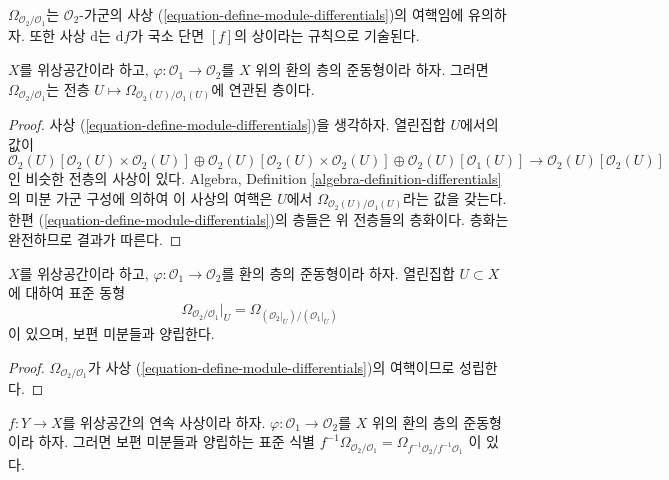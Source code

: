 \noindent
$\Omega_{\mathcal{O}_2/\mathcal{O}_1}$는
$\mathcal{O}_2$-가군의 사상
(\ref{equation-define-module-differentials})의 여핵임에 유의하자.
또한 사상 $\text{d}$는 $\text{d}f$가 국소 단면 $[f]$의 상이라는
규칙으로 기술된다.

\begin{lemma}
\label{lemma-differentials-sheafify}
$X$를 위상공간이라 하고,
$\varphi : \mathcal{O}_1 \to \mathcal{O}_2$를 $X$ 위의 환의 층의
준동형이라 하자. 그러면 $\Omega_{\mathcal{O}_2/\mathcal{O}_1}$는
전층 $U \mapsto \Omega_{\mathcal{O}_2(U)/\mathcal{O}_1(U)}$에
연관된 층이다.
\end{lemma}

\begin{proof}
사상 (\ref{equation-define-module-differentials})을 생각하자.
열린집합 $U$에서의 값이
$$
\mathcal{O}_2(U)[\mathcal{O}_2(U) \times \mathcal{O}_2(U)] \oplus
\mathcal{O}_2(U)[\mathcal{O}_2(U) \times \mathcal{O}_2(U)] \oplus
\mathcal{O}_2(U)[\mathcal{O}_1(U)]
\longrightarrow
\mathcal{O}_2(U)[\mathcal{O}_2(U)]
$$
인 비슷한 전층의 사상이 있다. Algebra, Definition
\ref{algebra-definition-differentials}의 미분 가군 구성에 의하여
이 사상의 여핵은 $U$에서
$\Omega_{\mathcal{O}_2(U)/\mathcal{O}_1(U)}$라는 값을 갖는다.
한편 (\ref{equation-define-module-differentials})의 층들은 위 전층들의
층화이다. 층화는 완전하므로 결과가 따른다.
\end{proof}

\begin{lemma}
\label{lemma-localize-differentials}
$X$를 위상공간이라 하고,
$\varphi : \mathcal{O}_1 \to \mathcal{O}_2$를 환의 층의 준동형이라 하자.
열린집합 $U \subset X$에 대하여 표준 동형
$$
\Omega_{\mathcal{O}_2/\mathcal{O}_1}|_U =
\Omega_{(\mathcal{O}_2|_U)/(\mathcal{O}_1|_U)}
$$
이 있으며, 보편 미분들과 양립한다.
\end{lemma}

\begin{proof}
$\Omega_{\mathcal{O}_2/\mathcal{O}_1}$가 사상
(\ref{equation-define-module-differentials})의 여핵이므로 성립한다.
\end{proof}

\begin{lemma}
\label{lemma-pullback-differentials}
$f : Y \to X$를 위상공간의 연속 사상이라 하자.
$\varphi : \mathcal{O}_1 \to \mathcal{O}_2$를 $X$ 위의 환의 층의
준동형이라 하자. 그러면 보편 미분들과 양립하는 표준 식별
$f^{-1}\Omega_{\mathcal{O}_2/\mathcal{O}_1} =
\Omega_{f^{-1}\mathcal{O}_2/f^{-1}\mathcal{O}_1}$
이 있다.
\end{lemma}

